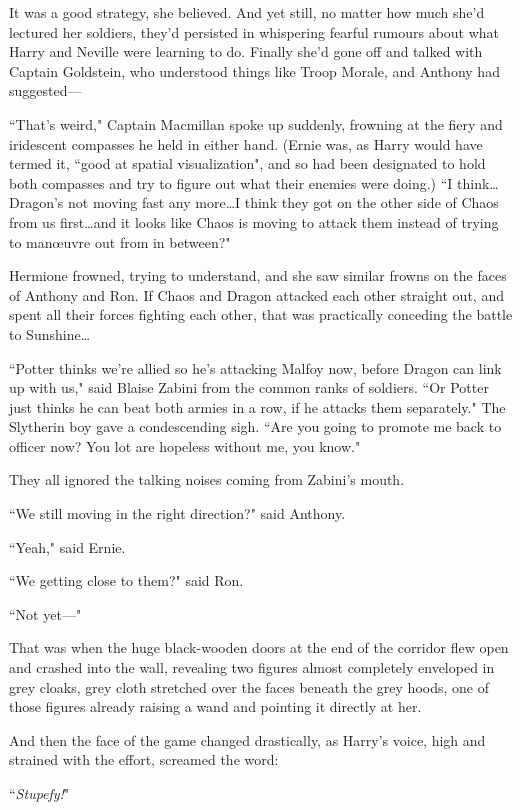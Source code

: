 It was a good strategy, she believed. And yet still, no matter how much she'd lectured her soldiers, they'd persisted in whispering fearful rumours about what Harry and Neville were learning to do. Finally she'd gone off and talked with Captain Goldstein, who understood things like Troop Morale, and Anthony had suggested—

``That's weird," Captain Macmillan spoke up suddenly, frowning at the fiery and iridescent compasses he held in either hand. (Ernie was, as Harry would have termed it, ``good at spatial visualization", and so had been designated to hold both compasses and try to figure out what their enemies were doing.) ``I think…Dragon's not moving fast any more…I think they got on the other side of Chaos from us first…and it looks like Chaos is moving to attack them instead of trying to manœuvre out from in between?"

Hermione frowned, trying to understand, and she saw similar frowns on the faces of Anthony and Ron. If Chaos and Dragon attacked each other straight out, and spent all their forces fighting each other, that was practically conceding the battle to Sunshine…

``Potter thinks we're allied so he's attacking Malfoy now, before Dragon can link up with us," said Blaise Zabini from the common ranks of soldiers. ``Or Potter just thinks he can beat both armies in a row, if he attacks them separately." The Slytherin boy gave a condescending sigh. ``Are you going to promote me back to officer now? You lot are hopeless without me, you know."

They all ignored the talking noises coming from Zabini's mouth.

``We still moving in the right direction?" said Anthony.

``Yeah," said Ernie.

``We getting close to them?" said Ron.

``Not yet—"

That was when the huge black-wooden doors at the end of the corridor flew open and crashed into the wall, revealing two figures almost completely enveloped in grey cloaks, grey cloth stretched over the faces beneath the grey hoods, one of those figures already raising a wand and pointing it directly at her.

And then the face of the game changed drastically, as Harry's voice, high and strained with the effort, screamed the word:

``\emph{Stupefy!}"

